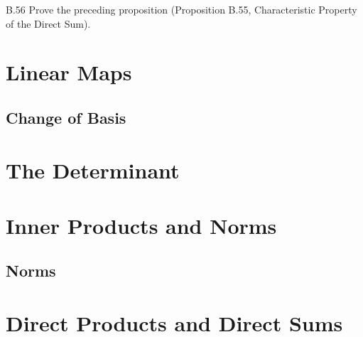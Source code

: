 \begin{exercise}{B.56}
    Prove the preceding proposition (Proposition B.55, Characteristic Property of the Direct Sum).
\end{exercise}

\section{Linear Maps}

\subsection{Change of Basis}

\section{The Determinant}

\section{Inner Products and Norms}

\subsection{Norms}

\section{Direct Products and Direct Sums}
